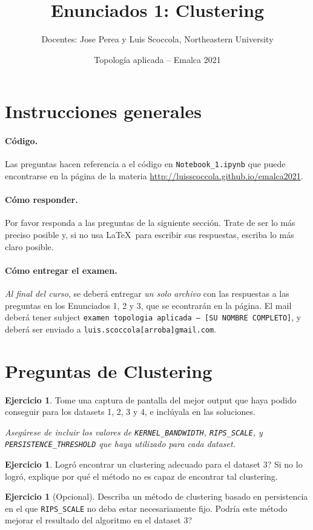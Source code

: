 \documentclass[12pt,reqno,oneside]{article}
\title{Enunciados 1: Clustering}
\date{Topolog\'{i}a aplicada -- Emalca 2021 }
\author{Docentes: Jose Perea y Luis Scoccola, Northeastern University}
\DeclareRobustCommand\squelch[1]{%
    \BeginAccSupp{method=plain,ActualText={}}#1\EndAccSupp{}}
\theoremstyle{definition}
\newtheorem{pregunta}[theorem]{Ejercicio}
\begin{document}
\maketitle

\section{Instrucciones generales}
%
\paragraph{C\'odigo.}
Las preguntas hacen referencia a el c\'odigo en \texttt{Notebook\_1.ipynb} que puede encontrarse en la p\'agina de la materia
\url{http://luisscoccola.github.io/emalca2021}.

\paragraph{C\'omo responder.}
Por favor responda a las preguntas de la siguiente secci\'on. 
Trate de ser lo m\'as preciso posible y, si no usa \LaTeX~para escribir sus respuestas, escriba lo m\'as claro posible.

\paragraph{C\'omo entregar el examen.}
\textit{Al final del curso}, se deber\'a entregar \textit{un solo archivo} con las respuestas a las preguntas en los Enunciados 1, 2 y 3, que se econtrar\'an en la p\'agina.
El mail deber\'a tener subject \texttt{examen topologia aplicada -- [SU NOMBRE COMPLETO]}, y deber\'a ser enviado a \squelch{\texttt{luis.scoccola[arroba]gmail.com}}.

\section{Preguntas de Clustering}
\begin{pregunta}
	Tome una captura de pantalla del mejor output que haya podido conseguir para los datasets 1, 2, 3 y 4, e incl\'uyala en las soluciones.

	\noindent
	\textit{Aseg\'urese de incluir los valores de \texttt{KERNEL\_BANDWIDTH}, \texttt{RIPS\_SCALE}, y \texttt{PERSISTENCE\_THRESHOLD} que haya utilizado para cada dataset.}
\end{pregunta}

\begin{pregunta}
	Logr\'o encontrar un clustering adecuado para el dataset 3?
	Si no lo logr\'o, explique por qu\'e el m\'etodo no es capaz de encontrar tal clustering.
\end{pregunta}

\begin{pregunta}[Opcional]
	Describa un m\'etodo de clustering basado en persistencia en el que \texttt{RIPS\_SCALE} no deba estar necesariamente fijo.
	Podr\'ia este m\'etodo mejorar el resultado del algoritmo en el dataset 3?
\end{pregunta}
\end{document}
